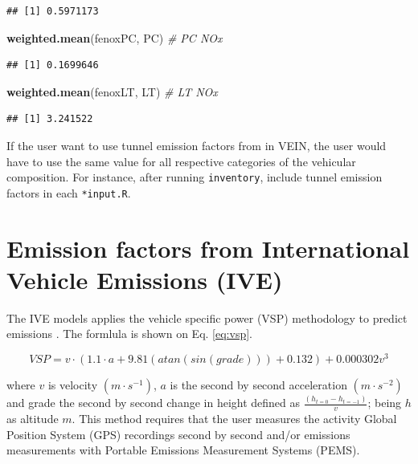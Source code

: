 \documentclass[12pt,graybox,envcountchap,sectrefs]{krantz}
\makeatletter
\newenvironment{Shaded}{\begin{snugshade}}{\end{snugshade}}
\newcommand{\KeywordTok}[1]{\textcolor[rgb]{0.13,0.29,0.53}{\textbf{#1}}}
\newcommand{\CommentTok}[1]{\textcolor[rgb]{0.56,0.35,0.01}{\textit{#1}}}
\newcommand{\NormalTok}[1]{#1}
\newenvironment{kframe}{%
\medskip{}
\setlength{\fboxsep}{.8em}
 \def\at@end@of@kframe{}%
 \ifinner\ifhmode%
  \def\at@end@of@kframe{\end{minipage}}%
  \begin{minipage}{\columnwidth}%
 \fi\fi%
 \def\FrameCommand##1{\hskip\@totalleftmargin \hskip-\fboxsep
 \colorbox{shadecolor}{##1}\hskip-\fboxsep
     \hskip-\linewidth \hskip-\@totalleftmargin \hskip\columnwidth}%
 \MakeFramed {\advance\hsize-\width
   \@totalleftmargin\z@ \linewidth\hsize
   \@setminipage}}%
 {\par\unskip\endMakeFramed%
 \at@end@of@kframe}
\renewenvironment{Shaded}{\begin{kframe}}{\end{kframe}}
\theoremstyle{definition}
\theoremstyle{definition}
\theoremstyle{definition}
\theoremstyle{remark}
\makeatother
\begin{document}
\begin{verbatim}
## [1] 0.5971173
\end{verbatim}

\begin{Shaded}
\begin{Highlighting}[]
\KeywordTok{weighted.mean}\NormalTok{(fenoxPC, PC) }\CommentTok{# PC NOx }
\end{Highlighting}
\end{Shaded}

\begin{verbatim}
## [1] 0.1699646
\end{verbatim}

\begin{Shaded}
\begin{Highlighting}[]
\KeywordTok{weighted.mean}\NormalTok{(fenoxLT, LT) }\CommentTok{# LT NOx}
\end{Highlighting}
\end{Shaded}

\begin{verbatim}
## [1] 3.241522
\end{verbatim}

If the user want to use tunnel emission factors from
\citet{perez2014emission} in VEIN, the user would have to use the same
value for all respective categories of the vehicular composition. For
instance, after running \texttt{inventory}, include tunnel emission
factors in each \texttt{*input.R}.

\section{Emission factors from International Vehicle Emissions
(IVE)}\label{emission-factors-from-international-vehicle-emissions-ive}

The IVE models applies the vehicle specific power (VSP) methodology to
predict emissions \citep{jimenez1999vehicle}. The formlula is shown on
Eq. \eqref{eq:vsp}.

\begin{equation}
VSP = v \cdot (1.1 \cdot a + 9.81(atan(sin(grade))) + 0.132) + 0.000302v^3
\label{eq:vsp}
\end{equation}

where \(v\) is velocity \((m \cdot s^{-1})\), \(a\) is the second by
second acceleration \((m \cdot s^{-2})\) and grade the second by second
change in height defined as \(\frac{(h_{t=0} - h_{t=-1})}{v}\); being
\(h\) as altitude \(m\). This method requires that the user measures the
activity Global Position System (GPS) recordings second by second and/or
emissions measurements with Portable Emissions Measurement Systems
(PEMS).
\end{document}
